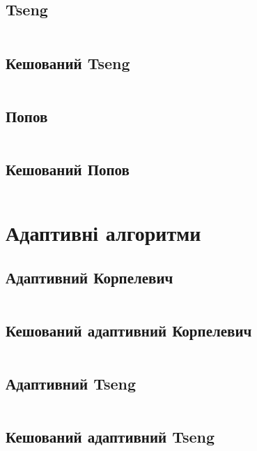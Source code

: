\newpage
\subsection{Tseng}
\inputminted[linenos,firstline=8,lastline=42,fontsize=\tiny]{python}{src/core/tseng.py}

\newpage
\subsection{Кешований Tseng}
\inputminted[linenos,firstline=45,fontsize=\tiny]{python}{src/core/tseng.py}

\newpage
\subsection{Попов}
\inputminted[linenos,firstline=8,lastline=45,fontsize=\tiny]{python}{src/core/popov.py}

\newpage
\subsection{Кешований Попов}
\inputminted[linenos,firstline=48,fontsize=\tiny]{python}{src/core/popov.py}

\section{Адаптивні алгоритми}

\subsection{Адаптивний Корпелевич}
\inputminted[linenos,firstline=8,lastline=54,fontsize=\tiny]{python}{src/adaptive/korpelevich.py}

\newpage
\subsection{Кешований адаптивний Корпелевич}
\inputminted[linenos,firstline=57,fontsize=\tiny]{python}{src/adaptive/korpelevich.py}

\newpage
\subsection{Адаптивний Tseng}
\inputminted[linenos,firstline=8,lastline=53,fontsize=\tiny]{python}{src/adaptive/tseng.py}

\newpage
\subsection{Кешований адаптивний Tseng}
\inputminted[linenos,firstline=56,fontsize=\tiny]{python}{src/adaptive/tseng.py}

